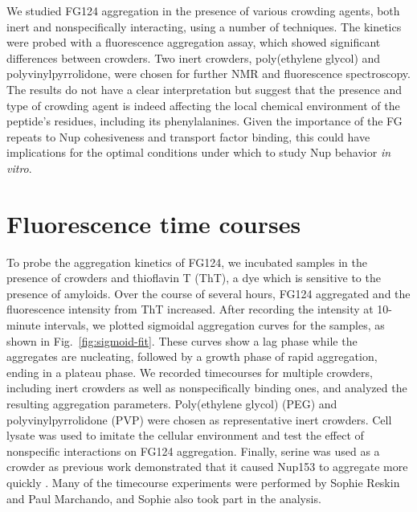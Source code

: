 We studied FG124 aggregation in the presence of various crowding agents, both inert and nonspecifically interacting, using a number of techniques.  The kinetics were probed with a fluorescence aggregation assay, which showed significant differences between crowders.  Two inert crowders, poly(ethylene glycol) and polyvinylpyrrolidone, were chosen for further NMR and fluorescence spectroscopy.  The results do not have a clear interpretation but suggest that the presence and type of crowding agent is indeed affecting the local chemical environment of the peptide's residues, including its phenylalanines.  Given the importance of the FG repeats to Nup cohesiveness and transport factor binding, this could have implications for the optimal conditions under which to study Nup behavior \textit{in vitro}.

\section{Fluorescence time courses}

To probe the aggregation kinetics of FG124, we incubated samples in the presence of crowders and thioflavin T (ThT), a dye which is sensitive to the presence of amyloids.  Over the course of several hours, FG124 aggregated and the fluorescence intensity from ThT increased.  After recording the intensity at 10-minute intervals, we plotted sigmoidal aggregation curves for the samples, as shown in Fig.~\ref{fig:sigmoid-fit}.  These curves show a lag phase while the aggregates are nucleating, followed by a growth phase of rapid aggregation, ending in a plateau phase.  We recorded timecourses for multiple crowders, including inert crowders as well as nonspecifically binding ones, and analyzed the resulting aggregation parameters.  Poly(ethylene glycol) (PEG) and polyvinylpyrrolidone (PVP) were chosen as representative inert crowders.  Cell lysate was used to imitate the cellular environment and test the effect of nonspecific interactions on FG124 aggregation.  Finally, serine was used as a crowder as previous work demonstrated that it caused Nup153 to aggregate more quickly \cite{milles13}.  Many of the timecourse experiments were performed by Sophie Reskin and Paul Marchando, and Sophie also took part in the analysis.

